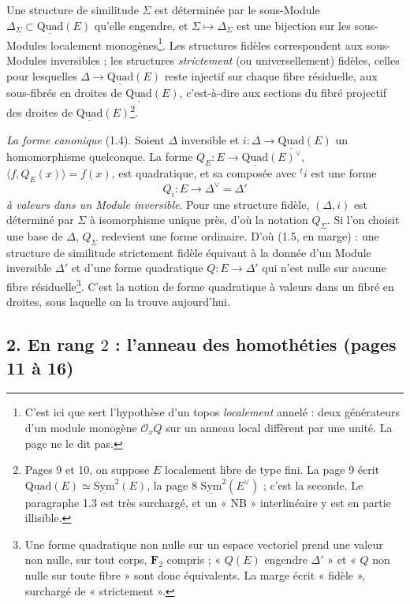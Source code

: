 \documentclass[11pt,a4paper]{article}
\begin{document}
Une structure de similitude $\Sigma$ est déterminée par le sous-Module $\Delta_\Sigma
\subset \underline{\mathrm{Quad}}(E)$ qu'elle engendre, et $\Sigma \mapsto \Delta_\Sigma$
est une bijection sur les sous-Modules localement monogènes\footnote{C'est ici
que sert l'hypothèse d'un topos \emph{localement} annelé : deux générateurs d'un
module monogène $\mathcal{O}_x Q$ sur un anneau local diffèrent par une unité. La
page ne le dit pas.}. Les structures fidèles correspondent aux sous-Modules
inversibles ; les structures \emph{strictement} (ou universellement) fidèles,
celles pour lesquelles $\Delta \to \underline{\mathrm{Quad}}(E)$ reste injectif sur
chaque fibre résiduelle, aux sous-fibrés en droites de
$\underline{\mathrm{Quad}}(E)$, c'est-à-dire aux sections du fibré projectif des
droites de $\underline{\mathrm{Quad}}(E)$\footnote{Pages 9 et 10, on suppose $E$
localement libre de type fini. La page 9 écrit
$\underline{\mathrm{Quad}}(E) \simeq \underline{\mathrm{Sym}}^{2}(E)$, la page 8
$\underline{\mathrm{Sym}}^{2}(E^{\vee})$ ; c'est la seconde. Le paragraphe 1.3 est
très surchargé, et un « NB » interlinéaire y est en partie illisible.}.

\emph{La forme canonique} (1.4). Soient $\Delta$ inversible et $i : \Delta \to
\underline{\mathrm{Quad}}(E)$ un homomorphisme quelconque. La forme
$Q_E : E \to \underline{\mathrm{Quad}}(E)^{\vee}$, $\langle f, Q_E(x)\rangle = f(x)$, est
quadratique, et sa composée avec ${}^{t}i$ est une forme
\[
  Q_i : E \longrightarrow \Delta^{\vee} = \Delta'
\]
\emph{à valeurs dans un Module inversible}. Pour une structure fidèle, $(\Delta, i)$
est déterminé par $\Sigma$ à isomorphisme unique près, d'où la notation
$Q_\Sigma$. Si l'on choisit une base de $\Delta$, $Q_\Sigma$ redevient une forme
ordinaire. D'où (1.5, en marge) : une structure de similitude strictement fidèle
équivaut à la donnée d'un Module inversible $\Delta'$ et d'une forme quadratique
$Q : E \to \Delta'$ qui n'est nulle sur aucune fibre résiduelle\footnote{Une forme
quadratique non nulle sur un espace vectoriel prend une valeur non nulle, sur
tout corps, $\mathbf{F}_2$ compris ; « $Q(E)$ engendre $\Delta'$ » et « $Q$ non nulle
sur toute fibre » sont donc équivalents. La marge écrit « fidèle », surchargé de
« strictement ».}. C'est la notion de forme quadratique à valeurs dans un fibré
en droites, sous laquelle on la trouve aujourd'hui.

\subsection*{2. En rang $2$ : l'anneau des homothéties (pages 11 à 16)}
\end{document}
